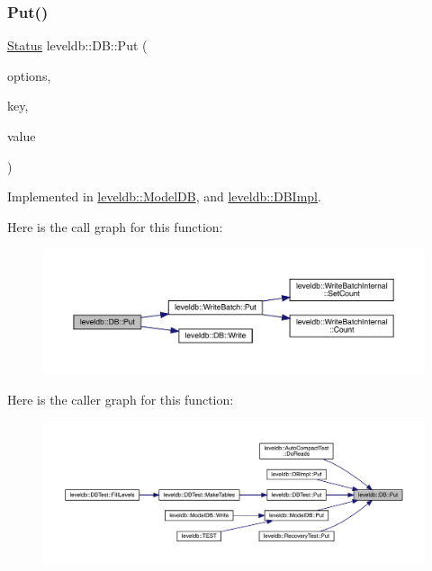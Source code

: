 \mbox{\label{classleveldb_1_1_d_b_ac2e472812630ed74298df7b03b08c1ae}} 
\subsubsection{\texorpdfstring{Put()}{Put()}}
{\footnotesize\ttfamily \mbox{\hyperlink{classleveldb_1_1_status}{Status}} leveldb\+::\+D\+B\+::\+Put (\begin{DoxyParamCaption}\item[{const \mbox{\hyperlink{structleveldb_1_1_write_options}{Write\+Options}} \&}]{options,  }\item[{const \mbox{\hyperlink{classleveldb_1_1_slice}{Slice}} \&}]{key,  }\item[{const \mbox{\hyperlink{classleveldb_1_1_slice}{Slice}} \&}]{value }\end{DoxyParamCaption})\hspace{0.3cm}{\ttfamily [pure virtual]}}



Implemented in \mbox{\hyperlink{classleveldb_1_1_model_d_b_a83d0ace11c8ff079f4e6eaa905744253}{leveldb\+::\+Model\+DB}}, and \mbox{\hyperlink{classleveldb_1_1_d_b_impl_ad0d56aeb4d84ff9632c9a7f3f1b7c4d5}{leveldb\+::\+D\+B\+Impl}}.

Here is the call graph for this function\+:
\nopagebreak
\begin{figure}[H]
\begin{center}
\leavevmode
\includegraphics[width=350pt]{classleveldb_1_1_d_b_ac2e472812630ed74298df7b03b08c1ae_cgraph}
\end{center}
\end{figure}
Here is the caller graph for this function\+:
\nopagebreak
\begin{figure}[H]
\begin{center}
\leavevmode
\includegraphics[width=350pt]{classleveldb_1_1_d_b_ac2e472812630ed74298df7b03b08c1ae_icgraph}
\end{center}
\end{figure}
\mbox{\label{classleveldb_1_1_d_b_aa46de65e990bd179db0aee770af89144}} 
